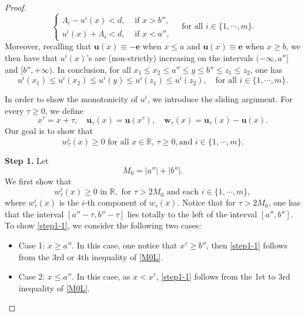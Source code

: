 \documentclass[11pt,twoside,reqno]{amsart}
\numberwithin{equation}{section}
\begin{document}
\begin{proof}
\begin{equation*}
\begin{cases}
\Lambda_i-u^i(x)<d, \,\, &\mbox{if}\,\, x> b'',\\
u^i(x)+\Lambda_i<d, \,\, &\mbox{if}\,\, x<a'',
\end{cases}\quad\mbox{for all }i\in\{1,\cdots,m\}.
\end{equation*}
Moreover, recalling that $\mathbf{u}(x)\equiv-\mathbf{e}$ when $x\leq a$ and $\mathbf{u}(x)\equiv\mathbf{e}$ when $x\geq b$, we then have that $u^{i}(x)$'s are (non-strictly) increasing on the intervals $(-\infty, a'']$ and $[b'', +\infty)$. In conclusion, for all $x_{1}\leq x_{2}\leq a''\leq y\leq b''\leq z_{1}\leq z_{2}$, one has
\begin{equation}\label{M0L}
    u^{i}(x_{1})\leq u^{i}(x_{2})\leq u^{i}(y)\leq u^{i}(z_{1})\leq u^{i}(z_{2}),\quad\mbox{for all }i\in\{1,\cdots,m\}.
\end{equation}

In order to show the monotonicity of $u^{i}$,  we introduce the sliding argument.
For every $\tau\geq0$,  we define
\begin{equation*}
    x^\tau=x+\tau,\quad\mathbf{u}_{\tau}(x)=\mathbf{u}(x^{\tau}),\quad\mathbf{w}_\tau (x)=\mathbf{u}_\tau (x)-\mathbf{u}(x).
\end{equation*}
Our goal is to show that 
$$w_{\tau}^{i}(x)\geq0\,\, \mbox{for all}\,\, x\in\mathbb{R}, \,\tau\geq0, \mbox{and}\,\, i\in\{1,\cdots,m\}.$$
    
\textbf{Step 1.} Let $$M_{0}=|a''|+|b''|.$$ We first show that
\begin{equation}\label{step1-1}
w^{i}_{\tau}(x) \geq 0  \,\, \mbox{in}\,\, \mathbb{R},\,\, \mbox{for}\,\, \tau >2M_0\,\, \mbox{and each}\,\,i\in\{1,\cdots,m\},
\end{equation}
where $w^{i}_\tau(x)$ is the $i$-th component of $w_{\tau}(x)$. Notice that for $\tau>2M_{0}$, one has that the interval $[a''-\tau,b''-\tau]$ lies totally to the left of the interval $[a'',b'']$. To show \eqref{step1-1}, we consider the following two cases:
\begin{itemize}
    \item Case 1: $x\geq a''$. In this case, one notice that $x^{\tau}\geq b''$, then \eqref{step1-1} follows from the 3rd or 4th inequality of \eqref{M0L}.
    \item Case 2: $x\leq a''$. In this case, as $x<x^{\tau}$, \eqref{step1-1} follows from the 1st to 3rd inequality of \eqref{M0L}.
\end{itemize}


\end{proof}
\end{document}
